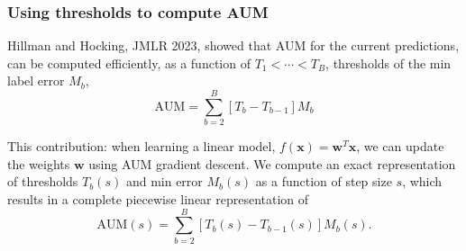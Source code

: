 \documentclass[t]{beamer}
\begin{document}
\begin{frame}
  \frametitle{Using thresholds to compute AUM}
Hillman and Hocking, JMLR 2023, showed that AUM for the
current predictions, can be computed efficiently, as a function of
$T_1<\cdots<T_B$, thresholds of the min label error $M_b$,
\begin{equation*}
  \text{AUM} = \sum_{b=2}^B [T_{b} - T_{b-1}] M_b
\end{equation*}

This contribution: when learning a linear model,
$f(\mathbf x)= \mathbf w^T \mathbf x$, we can update the weights
$\mathbf w$ using AUM gradient descent. We compute an exact
representation of thresholds $T_b(s)$ and min error $M_b(s)$ as a
function of step size $s$, which results in a complete piecewise
linear representation of
\begin{equation*}
  \text{AUM}(s) = \sum_{b=2}^B [T_{b}(s) - T_{b-1}(s)] M_b(s).
\end{equation*}
 
\end{frame}
\end{document}
